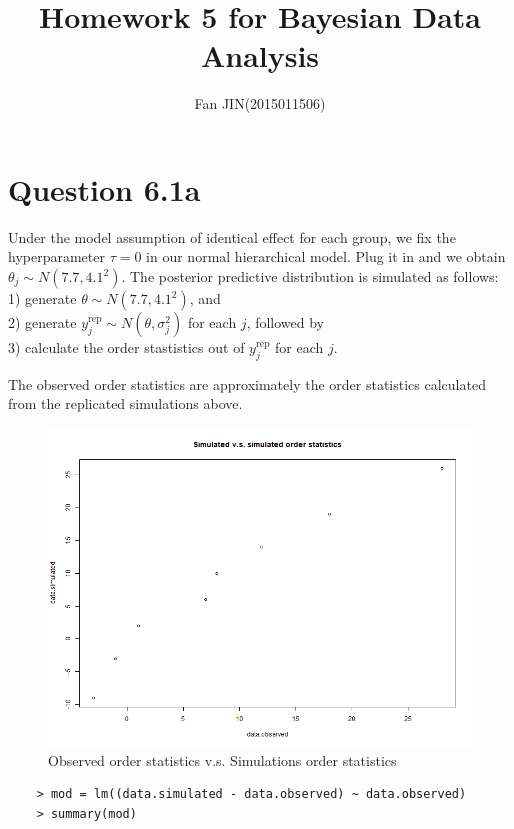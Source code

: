 \documentclass{article}
\begin{document}
\title{\textsf{Homework 5 for Bayesian Data Analysis}}
\author{Fan JIN\quad (2015011506)}
\maketitle

\section*{Question 6.1a}
{
    Under the model assumption of identical effect for each group, we fix the hyperparameter $\tau=0$ in our normal hierarchical model. Plug it in and we obtain $\theta_j \sim N(7.7, 4.1^2)$. The posterior predictive distribution is simulated as follows: \\
    1) generate $\theta \sim N(7.7, 4.1^2)$, and \\
    2) generate $y_j^\mathrm{rep} \sim N(\theta, \sigma_j^2)$ for each $j$, followed by \\
    3) calculate the order stastistics out of $y_j^\mathrm{rep}$ for each $j$.

    The observed order statistics are approximately the order statistics calculated from the replicated simulations above. 
    \begin{figure}[H]
      \centering
      \includegraphics[width = 1.0\linewidth]{data.vs.png}
      \caption{Observed order statistics v.s. Simulations order statistics}
    \end{figure}
    \begin{lstlisting}
    > mod = lm((data.simulated - data.observed) ~ data.observed)
    > summary(mod)
    

\end{lstlisting}}
\end{document}
